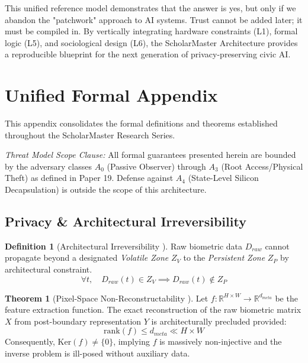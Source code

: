 \documentclass[conference]{IEEEtran}
\theoremstyle{definition}
\newtheorem{definition}{Definition}
\newtheorem{theorem}{Theorem}
\begin{document}
This unified reference model demonstrates that the answer is yes, but only if we abandon the "patchwork" approach to AI systems. Trust cannot be added later; it must be compiled in. By vertically integrating hardware constraints (L1), formal logic (L5), and sociological design (L6), the ScholarMaster Architecture provides a reproducible blueprint for the next generation of privacy-preserving civic AI.

\appendices

\section{Unified Formal Appendix}
\label{sec:appendix_theorems}

This appendix consolidates the formal definitions and theorems established throughout the ScholarMaster Research Series.

\textit{Threat Model Scope Clause:} All formal guarantees presented herein are bounded by the adversary classes $A_0$ (Passive Observer) through $A_3$ (Root Access/Physical Theft) as defined in Paper 19. Defense against $A_4$ (State-Level Silicon Decapsulation) is outside the scope of this architecture.

\subsection{Privacy \& Architectural Irreversibility}

\begin{definition}[Architectural Irreversibility \cite{P3, P17}]
Raw biometric data $D_{raw}$ cannot propagate beyond a designated \textit{Volatile Zone} $Z_V$ to the \textit{Persistent Zone} $Z_P$ by architectural constraint.
\begin{equation}
\forall t, \quad D_{raw}(t) \in Z_V \implies D_{raw}(t) \notin Z_P
\end{equation}
\end{definition}

\begin{theorem}[Pixel-Space Non-Reconstructability \cite{P19}]
Let $f: \mathbb{R}^{H \times W} \to \mathbb{R}^{d_{meta}}$ be the feature extraction function. The exact reconstruction of the raw biometric matrix $X$ from post-boundary representation $Y$ is architecturally precluded provided:
\begin{equation}
\text{rank}(f) \le d_{meta} \ll H \times W
\end{equation}
Consequently, $\text{Ker}(f) \neq \{0\}$, implying $f$ is massively non-injective and the inverse problem is ill-posed without auxiliary data.
\end{theorem}
\end{document}
